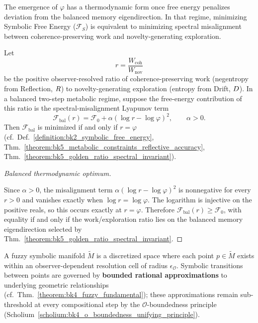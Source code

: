 The emergence of $\varphi$ has a thermodynamic form once free energy penalizes deviation from the balanced memory eigendirection. In that regime, minimizing Symbolic Free Energy ($\mathcal{F}_S$) is equivalent to minimizing spectral misalignment between coherence-preserving work and novelty-generating exploration.

\begin{proposition}
\label{proposition:bk5_golden_ratio_thermodynamic_optimum}
Let
\[
r=\frac{W_{\mathrm{coh}}}{W_{\mathrm{nov}}}
\]
be the positive observer-resolved ratio of coherence-preserving work
(negentropy from Reflection, $R$) to novelty-generating exploration
(entropy from Drift, $D$).  In a balanced two-step metabolic regime, suppose
the free-energy contribution of this ratio is the spectral-misalignment
Lyapunov term
\[
\mathcal{F}_{\mathrm{bal}}(r)=\mathcal{F}_0+\alpha(\log r-\log\varphi)^2,
\qquad \alpha>0.
\]
Then $\mathcal{F}_{\mathrm{bal}}$ is minimized if and only if $r=\varphi$
(cf.~Def.~\ref{definition:bk2_symbolic_free_energy},
Thm.~\ref{theorem:bk5_metabolic_constraints_reflective_accuracy},
Thm.~\ref{theorem:bk5_golden_ratio_spectral_invariant}).
\end{proposition}

\begin{proof}[Balanced thermodynamic optimum]
\label{proof:bk5_golden_ratio_thermodynamic_optimum}
\leavevmode

Since $\alpha>0$, the misalignment term
$\alpha(\log r-\log\varphi)^2$ is nonnegative for every $r>0$ and vanishes
exactly when $\log r=\log\varphi$.  The logarithm is injective on the positive
reals, so this occurs exactly at $r=\varphi$.  Therefore
$\mathcal{F}_{\mathrm{bal}}(r)\geq\mathcal{F}_0$, with equality if and only if
the work/exploration ratio lies on the balanced memory eigendirection selected
by Thm.~\ref{theorem:bk5_golden_ratio_spectral_invariant}.
\end{proof}

\begin{definition}
\label{definition:bk5_fuzzy_symbolic_manifold}
A fuzzy symbolic manifold $\tilde{M}$ is a discretized space where each point $p \in \tilde{M}$ exists within an observer-dependent resolution cell of radius $\epsilon_\mathcal{O}$. Symbolic transitions between points are governed by \textbf{bounded rational approximations} to underlying geometric relationships (cf.~Thm.~\ref{theorem:bk4_fuzzy_fundamental}); these approximations remain sub-threshold at every compositional step by the $\mathcal{O}$-boundedness principle (Scholium~\ref{scholium:bk4_o_boundedness_unifying_principle}).
\end{definition}

